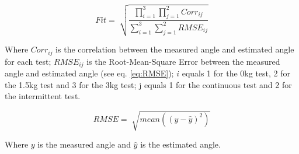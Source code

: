 \documentclass[letterpaper, 10 pt, conference]{ieeeconf}  %
\begin{document}

\begin{equation}
\label{eq:fitness}
Fit = \sqrt[]{\frac{\prod_{i=1}^{3}\prod_{j=1}^{2} Corr_{ij}}{\sum_{i=1}^{3}\sum_{j=1}^{2} RMSE_{ij}}}
\end{equation}

Where $Corr_{ij}$ is the correlation between the measured angle and estimated angle for each test; $RMSE_{ij}$ is the Root-Mean-Square Error between the measured angle and estimated angle (see eq. \ref{eq:RMSE}); $i$ equals 1 for the 0kg test, 2 for the 1.5kg test and 3 for the 3kg test; j equals 1 for the continuous test and 2 for the intermittent test.

\begin{equation}
\label{eq:RMSE}
RMSE = \sqrt[]{mean((y-\hat{y})^2)}
\end{equation}


Where $y$ is the measured angle and $\hat{y}$ is the estimated angle.





\end{document}

